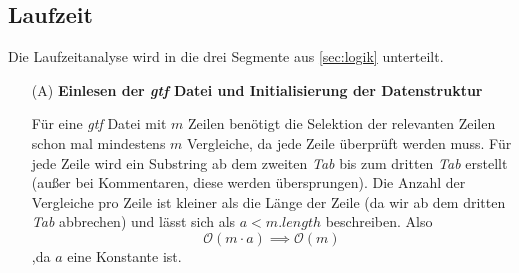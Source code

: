 \documentclass[12pt]{article}
\begin{document}
\subsection{Laufzeit}
Die Laufzeitanalyse wird in die drei Segmente aus \ref{sec:logik} unterteilt.
\begin{enumerate}
    \item[(A)] \textbf{Einlesen der \textit{gtf} Datei und Initialisierung der Datenstruktur}

        Für eine \textit{gtf} Datei mit $m$ Zeilen benötigt die Selektion der relevanten Zeilen
        schon mal mindestens $m$ Vergleiche, da jede Zeile überprüft werden muss.
        Für jede Zeile wird ein Substring ab dem zweiten \textit{Tab} bis zum dritten \textit{Tab} erstellt (au\ss er bei Kommentaren, diese werden übersprungen). 
        Die Anzahl der Vergleiche pro Zeile ist kleiner als die Länge der Zeile (da wir ab dem dritten \textit{Tab} abbrechen) und lässt 
        sich als $a < m.length$ beschreiben. Also
        \begin{equation}
            \mathcal{O}(m \cdot a) \implies \mathcal{O}(m)
        \end{equation}
        ,da $a$ eine Konstante ist.
        

\end{enumerate}
\end{document}
